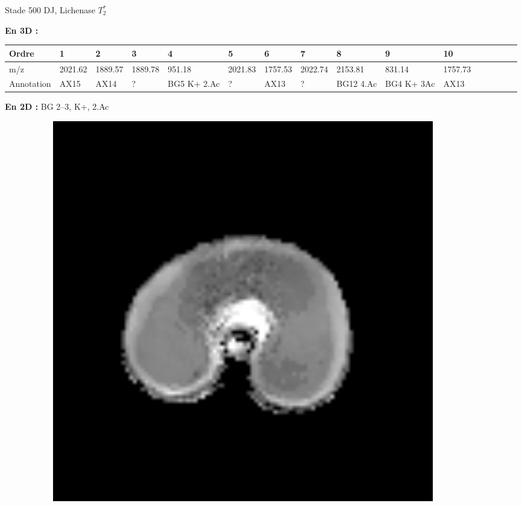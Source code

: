 \documentclass[10pt]{beamer}
\begin{document}
\begin{frame}{Stade 500 DJ, Lichenase}
  \textbf{$T_2^*$}

  
  \textbf{En 3D :}
  \vspace{-0.4cm}
    \begin{table}[]
    \centering
    \begin{adjustbox}{max width=1\textwidth}
      \begin{tabular}{llllllllllllllll}
        \toprule
        Ordre & 1       & 2       & 3       & 4       & 5       & 6       & 7       & 8       & 9       & 10       \\
        \midrule
        m/z &     2021.62 & 1889.57 & 1889.78 & 951.18 & 2021.83 & 1757.53 & 2022.74 & 2153.81 & 831.14 & 1757.73 \\
        Annotation &  AX15 & AX14 & ? & BG5 K+ 2.Ac & ? & AX13 & ? & BG12 4.Ac & BG4 K+ 3Ac & AX13\\
        \bottomrule
      \end{tabular}
    \end{adjustbox}
  \end{table}


  \textbf{En 2D :} BG 2--3, K+, 2.Ac

  \begin{figure}[ht]
    \centering
    \begin{subfigure}[t]{0.33\textwidth}
      \centering
      \includegraphics[width=0.9\textwidth]{fig/stats_500Lich_t2_irm}


\end{subfigure}
\end{figure}
\end{frame}
\end{document}
